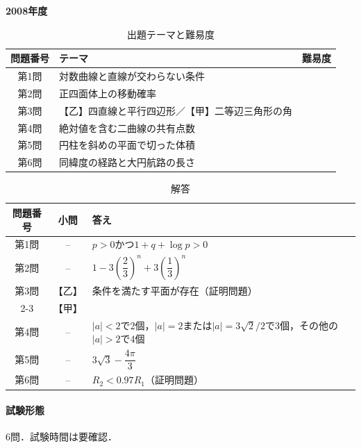 \documentclass[../../main.tex]{subfiles}
\begin{document}
\begin{center}
  {\fontsize{48pt}{58pt}\selectfont \textbf{2008}\normalsize\textbf{年度}}
\end{center}

\begin{table}[htb]
  \centering
  \caption{出題テーマと難易度}
  \begin{tabular}{|c|p{9cm}|c|}
    \hline
    \textbf{問題番号} & \textbf{テーマ} & \textbf{難易度} \\
    \hline
    第1問 & 対数曲線と直線が交わらない条件 & \\
    \hline
    第2問 & 正四面体上の移動確率 & \\
    \hline
    第3問 & 【乙】四直線と平行四辺形／【甲】二等辺三角形の角 & \\
    \hline
    第4問 & 絶対値を含む二曲線の共有点数 & \\
    \hline
    第5問 & 円柱を斜めの平面で切った体積 & \\
    \hline
    第6問 & 同緯度の経路と大円航路の長さ & \\
    \hline
  \end{tabular}
\end{table}

\begin{table}[htb]
  \centering
  \caption{解答}
  \renewcommand{\arraystretch}{1.4}
  \begin{tabular}{|c|c|p{9cm}|}
    \hline
    \textbf{問題番号} & \textbf{小問} & \textbf{答え} \\
    \hline
    第1問 & -- & $p>0$かつ$1+q+\log p>0$ \\
    \hline
    第2問 & -- & $1-3\left(\dfrac{2}{3}\right)^n+3\left(\dfrac{1}{3}\right)^n$ \\
    \hline
    第3問 & 【乙】 & 条件を満たす平面が存在（証明問題） \\
    \cline{2-3}
    & 【甲】 &  \\
    \hline
    第4問 & -- & $|a|<2$で2個，$|a|=2$または$|a|=3\sqrt{2}/2$で3個，その他の$|a|>2$で4個 \\
    \hline
    第5問 & -- & $3\sqrt{3}-\dfrac{4\pi}{3}$ \\
    \hline
    第6問 & -- & $R_2<0.97R_1$（証明問題） \\
    \hline
  \end{tabular}
\end{table}

\paragraph{試験形態}
6問．試験時間は要確認．
\end{document}

